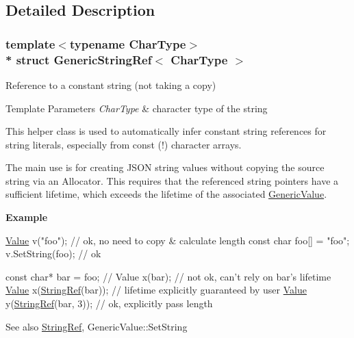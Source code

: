 \subsection{Detailed Description}
\subsubsection*{template$<$typename Char\+Type$>$\\*
struct Generic\+String\+Ref$<$ Char\+Type $>$}

Reference to a constant string (not taking a copy) 


\begin{DoxyTemplParams}{Template Parameters}
{\em Char\+Type} & character type of the string\\
\hline
\end{DoxyTemplParams}
This helper class is used to automatically infer constant string references for string literals, especially from {\ttfamily const} {\bfseries }(!) character arrays.

The main use is for creating J\+S\+ON string values without copying the source string via an Allocator. This requires that the referenced string pointers have a sufficient lifetime, which exceeds the lifetime of the associated \hyperlink{classGenericValue}{Generic\+Value}.

{\bfseries Example} 
\begin{DoxyCode}
\hyperlink{classGenericValue}{Value} v(\textcolor{stringliteral}{"foo"});   \textcolor{comment}{// ok, no need to copy & calculate length}
\textcolor{keyword}{const} \textcolor{keywordtype}{char} foo[] = \textcolor{stringliteral}{"foo"};
v.SetString(foo); \textcolor{comment}{// ok}

\textcolor{keyword}{const} \textcolor{keywordtype}{char}* bar = foo;
\textcolor{comment}{// Value x(bar); // not ok, can't rely on bar's lifetime}
\hyperlink{classGenericValue}{Value} x(\hyperlink{structGenericStringRef_aa6b9fd9f6aa49405a574c362ba9af6b5}{StringRef}(bar)); \textcolor{comment}{// lifetime explicitly guaranteed by user}
\hyperlink{classGenericValue}{Value} y(\hyperlink{structGenericStringRef_aa6b9fd9f6aa49405a574c362ba9af6b5}{StringRef}(bar, 3));  \textcolor{comment}{// ok, explicitly pass length}
\end{DoxyCode}


\begin{DoxySeeAlso}{See also}
\hyperlink{structGenericStringRef_aa6b9fd9f6aa49405a574c362ba9af6b5}{String\+Ref}, Generic\+Value\+::\+Set\+String 
\end{DoxySeeAlso}


